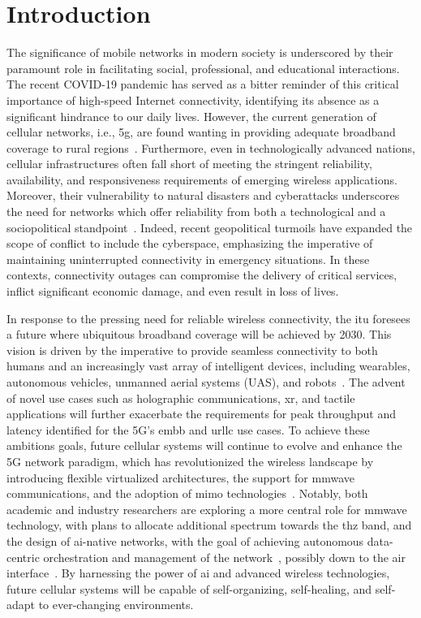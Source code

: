 \chapter{Introduction}

The significance of mobile networks in modern society is underscored by their paramount role in facilitating social, professional, and educational interactions. The recent COVID-19 pandemic has served as a bitter reminder of this critical importance of high-speed Internet connectivity, identifying its absence as a significant hindrance to our daily lives.
However, the current generation of cellular networks, i.e., \gls{5g}, are found wanting in providing adequate broadband coverage to rural regions~\cite{yaacoub2020key}. Furthermore, even in technologically advanced nations, cellular infrastructures often fall short of meeting the stringent reliability, availability, and responsiveness requirements of emerging wireless applications. Moreover, their vulnerability to natural disasters and cyberattacks underscores the need for networks which offer reliability from both a technological and a sociopolitical standpoint~\cite{internet_ukr_afg}.
Indeed, recent geopolitical turmoils have expanded the scope of conflict to include the cyberspace, emphasizing the imperative of maintaining uninterrupted connectivity in emergency situations. In these contexts, connectivity outages can compromise the delivery of critical services, inflict significant economic damage, and even result in loss of lives.

In response to the pressing need for reliable wireless connectivity, the \gls{itu} foresees a future where ubiquitous broadband coverage will be achieved by 2030. This vision is driven by the imperative to provide seamless connectivity to both humans and an increasingly vast array of intelligent devices, including wearables, autonomous vehicles, unmanned aerial systems (UAS), and robots~\cite{mozaffari2018beyond}.
The advent of novel use cases such as holographic communications, \gls{xr}, and tactile applications will further exacerbate the requirements for peak throughput and latency identified for the 5G's \gls{embb} and \gls{urllc} use cases. 
To achieve these ambitions goals, future cellular systems will continue to evolve and enhance the 5G network paradigm, which has revolutionized the wireless landscape by introducing flexible virtualized architectures, the support for \gls{mmwave} communications, and the adoption of \gls{mimo} technologies~\cite{ghosh20195g}. 
Notably, both academic and industry researchers are exploring a more central role for \gls{mmwave} technology, with plans to allocate additional spectrum towards the \gls{thz} band, and the design of \gls{ai}-native networks, with the goal of achieving autonomous data-centric orchestration and management of the network~\cite{polese20216g}, possibly down to the air interface~\cite{hoydis2021toward}.
By harnessing the power of \gls{ai} and advanced wireless technologies, future cellular systems will be capable of self-organizing, self-healing, and self-adapt to ever-changing environments.

